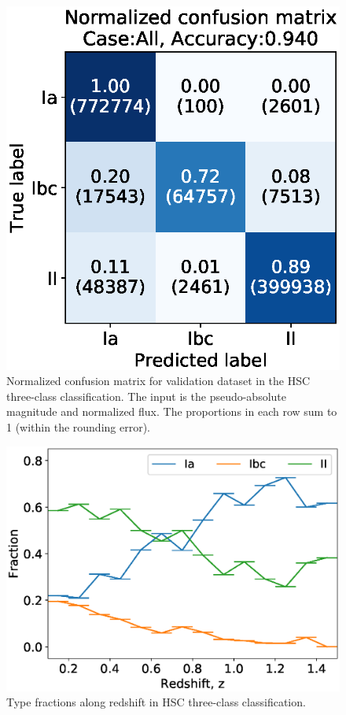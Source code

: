 \documentclass[proof]{pasj01}
\providecommand{\DIFadd}[1]{{\protect\color{blue} \sf #1}} %
\providecommand{\DIFaddFL}[1]{\DIFadd{#1}} %
\providecommand{\DIFaddbeginFL}{} %
\providecommand{\DIFaddendFL}{} %
\newcommand{\DIFaddincludegraphics}[2][]{{\color{blue}\fbox{\DIFOincludegraphics[#1]{#2}}}} %
\DeclareRobustCommand{\DIFaddbeginFL}{\DIFOaddbeginFL \let\includegraphics\DIFaddincludegraphics} %
\DeclareRobustCommand{\DIFaddendFL}{\DIFOaddendFL \let\includegraphics\DIFOincludegraphics} %
\begin{document}
\begin{figure}[htbp]
  \begin{center}
     \includegraphics[width=\columnwidth]{figures/13_CM_abs-mag_scaled-flux_w-mixup_remove-y_predictions_validation_2_Flagall_weighted.eps}
  \end{center}
  \caption{%
  Normalized confusion matrix for validation dataset in the HSC three-class classification.
  The input is \DIFaddbeginFL \DIFaddFL{the }\DIFaddendFL pseudo-absolute magnitude and normalized flux.
  The proportions in each row sum to 1 (within \DIFaddbeginFL \DIFaddFL{the }\DIFaddendFL rounding error).
  }%
  \label{fig:h3_validation_CM}
\end{figure}
%
%
%
\begin{figure}[htbp]
  \begin{center}
     \includegraphics[width=\columnwidth]{figures/SNfrac_alongz.eps}
  \end{center}
  \caption{%
  Type fractions along redshift in HSC three-class classification.
  }%
  \label{fig:hsc3_type_frac_alongz}
\end{figure}
\end{document}
